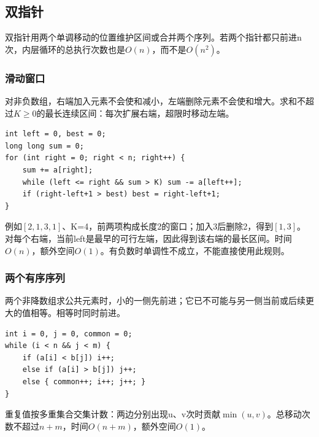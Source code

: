 \documentclass[UTF8,11pt,a4paper,fontset=none]{ctexart}
\begin{document}
\subsection{双指针}
双指针用两个单调移动的位置维护区间或合并两个序列。若两个指针都只前进n次，内层循环的总执行次数也是$O(n)$，而不是$O(n^2)$。
\subsubsection{滑动窗口}
对非负数组，右端加入元素不会使和减小，左端删除元素不会使和增大。求和不超过$K\ge0$的最长连续区间：每次扩展右端，超限时移动左端。
\par\noindent\begin{minipage}{\linewidth}
\begin{lstlisting}
int left = 0, best = 0;
long long sum = 0;
for (int right = 0; right < n; right++) {
    sum += a[right];
    while (left <= right && sum > K) sum -= a[left++];
    if (right-left+1 > best) best = right-left+1;
}
\end{lstlisting}
\end{minipage}\par
例如$[2,1,3,1]$、K=4，前两项构成长度2的窗口；加入3后删除2，得到$[1,3]$。对每个右端，当前left是最早的可行左端，因此得到该右端的最长区间。时间$O(n)$，额外空间$O(1)$。有负数时单调性不成立，不能直接使用此规则。
\subsubsection{两个有序序列}
两个非降数组求公共元素时，小的一侧先前进；它已不可能与另一侧当前或后续更大的值相等。相等时同时前进。
\par\noindent\begin{minipage}{\linewidth}
\begin{lstlisting}
int i = 0, j = 0, common = 0;
while (i < n && j < m) {
    if (a[i] < b[j]) i++;
    else if (a[i] > b[j]) j++;
    else { common++; i++; j++; }
}
\end{lstlisting}
\end{minipage}\par
重复值按多重集合交集计数：两边分别出现u、v次时贡献$\min(u,v)$。总移动次数不超过$n+m$，时间$O(n+m)$，额外空间$O(1)$。
\end{document}
